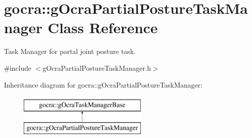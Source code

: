 \hypertarget{classgocra_1_1gOcraPartialPostureTaskManager}{}\section{gocra\+:\+:g\+Ocra\+Partial\+Posture\+Task\+Manager Class Reference}
\label{classgocra_1_1gOcraPartialPostureTaskManager}


Task Manager for partal joint posture task.  




{\ttfamily \#include $<$g\+Ocra\+Partial\+Posture\+Task\+Manager.\+h$>$}

Inheritance diagram for gocra\+:\+:g\+Ocra\+Partial\+Posture\+Task\+Manager\+:\begin{figure}[H]
\begin{center}
\leavevmode
\includegraphics[height=2.000000cm]{d9/dc9/classgocra_1_1gOcraPartialPostureTaskManager}
\end{center}
\end{figure}
